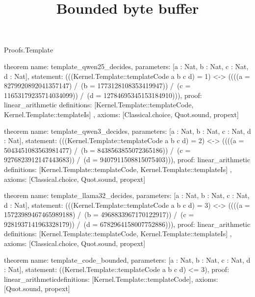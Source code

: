 \begin{lexlean}{Proofs.Template}
\title{Bounded byte buffer}
\begin{semanticmodule}
theorem{
  name: template_qwen25_decides,
  parameters: [a : Nat, b : Nat, c : Nat, d : Nat],
  statement: (((Kernel.Template::templateCode a b c d) = 1) <-> ((((a = 8279920892041357147) /\ (b = 1773128108353419947)) /\ (c = 11653179235714034099)) /\ (d = 12784695345153184910))),
  proof: linear_arithmetic{
    definitions: [Kernel.Template::templateCode, Kernel.Template::templateIs]
  },
  axioms: [Classical.choice, Quot.sound, propext]
}

theorem{
  name: template_qwen3_decides,
  parameters: [a : Nat, b : Nat, c : Nat, d : Nat],
  statement: (((Kernel.Template::templateCode a b c d) = 2) <-> ((((a = 5043451083563981477) /\ (b = 8438563855072365186)) /\ (c = 9276823912147443683)) /\ (d = 9407911508815075403))),
  proof: linear_arithmetic{
    definitions: [Kernel.Template::templateCode, Kernel.Template::templateIs]
  },
  axioms: [Classical.choice, Quot.sound, propext]
}

theorem{
  name: template_llama32_decides,
  parameters: [a : Nat, b : Nat, c : Nat, d : Nat],
  statement: (((Kernel.Template::templateCode a b c d) = 3) <-> ((((a = 15723989467465989188) /\ (b = 4968833967170122917)) /\ (c = 9281937141963328179)) /\ (d = 6782964158007752886))),
  proof: linear_arithmetic{
    definitions: [Kernel.Template::templateCode, Kernel.Template::templateIs]
  },
  axioms: [Classical.choice, Quot.sound, propext]
}

theorem{
  name: template_code_bounded,
  parameters: [a : Nat, b : Nat, c : Nat, d : Nat],
  statement: ((Kernel.Template::templateCode a b c d) <= 3),
  proof: linear_arithmetic{definitions: [Kernel.Template::templateCode]},
  axioms: [Quot.sound, propext]
}
\end{semanticmodule}
\end{lexlean}
